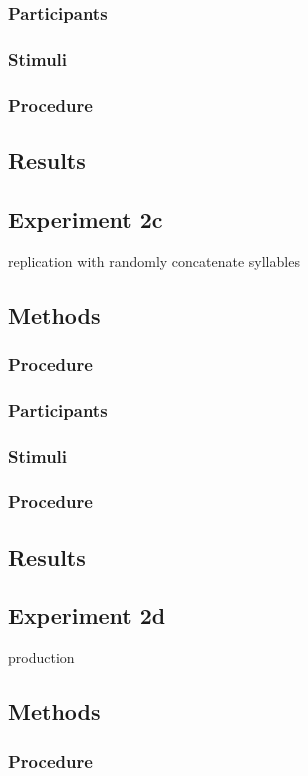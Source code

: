 \documentclass[man]{apa2}
\begin{document}
\subsubsection{Participants}
\subsubsection{Stimuli}
\subsubsection{Procedure}
\subsection{Results}


\subsection{\textbf{Experiment 2c}}
 replication with randomly concatenate syllables
\subsection{Methods}
\subsubsection{Procedure}
\subsubsection{Participants}
\subsubsection{Stimuli}
\subsubsection{Procedure}
\subsection{Results}


\subsection{\textbf{Experiment 2d}}
production
\subsection{Methods}
\subsubsection{Procedure}
\end{document}
